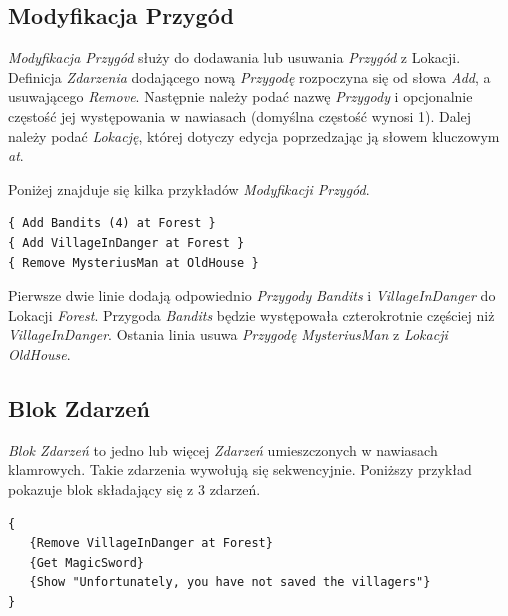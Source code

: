 \documentclass[openright]{xmgr}
\begin{document}
\subsection{Modyfikacja Przygód}
\textit{Modyfikacja Przygód} służy do dodawania lub usuwania \textit{Przygód} z Lokacji. Definicja \textit{Zdarzenia} dodającego nową \textit{Przygodę} rozpoczyna się od słowa \textit{Add}, a usuwającego \textit{Remove}. Następnie należy podać nazwę \textit{Przygody} i opcjonalnie częstość jej występowania w nawiasach (domyślna częstość wynosi 1). Dalej należy podać \textit{Lokację}, której dotyczy edycja poprzedzając ją słowem kluczowym \textit{at}.

Poniżej znajduje się kilka przykładów \textit{Modyfikacji Przygód}. 
\begin{verbatim}
{ Add Bandits (4) at Forest }
{ Add VillageInDanger at Forest }
{ Remove MysteriusMan at OldHouse }
\end{verbatim}
Pierwsze dwie linie dodają odpowiednio \textit{Przygody} \textit{Bandits} i \textit{VillageInDanger} do Lokacji \textit{Forest}. Przygoda \textit{Bandits} będzie występowała czterokrotnie częściej niż \textit{VillageInDanger}. Ostania linia usuwa \textit{Przygodę} \textit{MysteriusMan} z \textit{Lokacji} \textit{OldHouse}.

\subsection*{Blok Zdarzeń}
\textit{Blok Zdarzeń } to jedno lub więcej \textit{Zdarzeń} umieszczonych w nawiasach klamrowych. Takie zdarzenia wywołują się sekwencyjnie.
Poniższy przykład pokazuje blok składający się z 3 zdarzeń.
\begin{verbatim}
{
   {Remove VillageInDanger at Forest}
   {Get MagicSword}
   {Show "Unfortunately, you have not saved the villagers"}
}
\end{verbatim}
\end{document}

